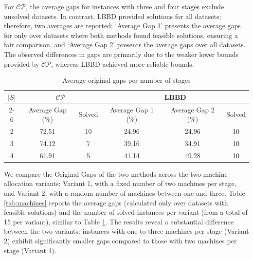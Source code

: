 \documentclass[a4paper,final]{article}
\begin{document}
        For $\mathcal{CP}$, the average gaps for instances with three and four stages exclude unsolved datasets. In contrast, LBBD provided solutions for all datasets; therefore, two averages are reported: `Average Gap 1' presents the average gaps for only over datasets where both methods found feasible solutions, ensuring a fair comparison, and `Average Gap 2' presents the average gaps over all datasets. The observed differences in gaps are primarily due to the weaker lower bounds provided by $\mathcal{CP}$, whereas LBBD achieved more reliable bounds.

        \begin{table}[H]
            \centering
            \caption{Average original gaps per number of stages}
            \label{tab:stages}
            \begin{tabular}{|c|cc|ccc|}
            \hline
            \multirow{2}{*}{$|S|$} & \multicolumn{2}{|c|}{$\mathcal{CP}$} & \multicolumn{3}{|c|}{LBBD} \\ \cline{2-6}
            & Average Gap (\%) & Solved & Average Gap 1 (\%) & Average Gap 2 (\%) & Solved \\ \hline
            2                    & 72.51                 & 10         & 24.96              & 24.96              & 10     \\
            3                    & 74.12                 & 7          & 39.16              & 34.91              & 10     \\
            4                    & 61.91                 & 5          & 41.14              & 49.28              & 10 \\ \hline   
            \end{tabular}
        \end{table}

        We compare the Original Gaps of the two methods across the two machine allocation variants: Variant 1, with a fixed number of two machines per stage, and Variant 2, with a random number of machines between one and three. Table \ref{tab:machines} reports the average gaps (calculated only over datasets with feasible solutions) and the number of solved instances per variant (from a total of 15 per variant), similar to Table \ref{tab:stages}. The results reveal a substantial difference between the two variants: instances with one to three machines per stage (Variant 2) exhibit significantly smaller gaps compared to those with two machines per stage (Variant 1).
\end{document}
